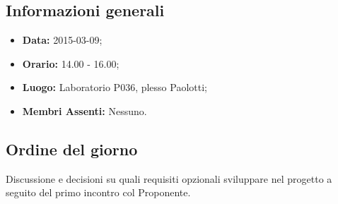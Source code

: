 \subsection{Informazioni generali}
\begin{itemize}
	\item \textbf{Data:} 2015-03-09;
	\item \textbf{Orario:} 14.00 - 16.00;
	\item \textbf{Luogo:} Laboratorio P036, plesso Paolotti;
	\item \textbf{Membri Assenti:} Nessuno.
\end{itemize}

\subsection{Ordine del giorno}
Discussione e decisioni su quali requisiti opzionali sviluppare nel progetto \PROGETTO{} a seguito del primo incontro col Proponente.

